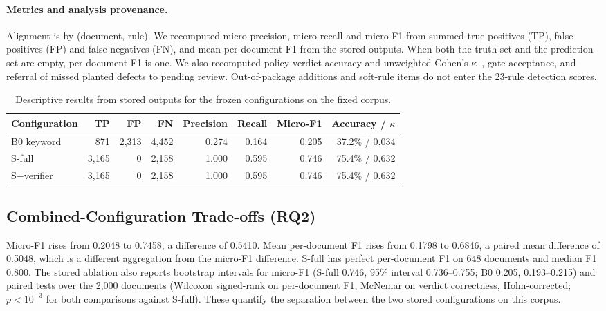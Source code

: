 \documentclass[computers,article,submit,moreauthors]{Definitions/mdpi}
\begin{document}
\paragraph{Metrics and analysis provenance.}
Alignment is by (document, rule). We recomputed micro-precision, micro-recall and micro-F1 from summed true positives (TP), false positives (FP) and false negatives (FN), and mean per-document F1 from the stored outputs. When both the truth set and the prediction set are empty, per-document F1 is one. We also recomputed policy-verdict accuracy and unweighted Cohen's $\kappa$~\cite{cohen1960,landis1977}, gate acceptance, and referral of missed planted defects to pending review. Out-of-package additions and soft-rule items do not enter the 23-rule detection scores.

\begin{table}[!ht]
\caption{Descriptive results from stored outputs for the frozen configurations on the fixed corpus.}
\label{tab:results}
\centering\footnotesize
\begin{tabular}{@{}lrrrrrrr@{}}
\toprule
Configuration & TP & FP & FN & Precision & Recall & Micro-F1 & Accuracy / $\kappa$ \\
\midrule
B0 keyword & 871 & 2,313 & 4,452 & 0.274 & 0.164 & 0.205 & 37.2\% / 0.034 \\
S-full & 3,165 & 0 & 2,158 & 1.000 & 0.595 & 0.746 & 75.4\% / 0.632 \\
S$-$verifier & 3,165 & 0 & 2,158 & 1.000 & 0.595 & 0.746 & 75.4\% / 0.632 \\
\bottomrule
\end{tabular}
\end{table}

\subsection{Combined-Configuration Trade-offs (RQ2)}

Micro-F1 rises from 0.2048 to 0.7458, a difference of 0.5410. Mean per-document F1 rises from 0.1798 to 0.6846, a paired mean difference of 0.5048, which is a different aggregation from the micro-F1 difference. S-full has perfect per-document F1 on 648 documents and median F1 0.800. The stored ablation also reports bootstrap intervals for micro-F1 (S-full 0.746, 95\% interval 0.736--0.755; B0 0.205, 0.193--0.215) and paired tests over the 2,000 documents (Wilcoxon signed-rank on per-document F1, McNemar on verdict correctness, Holm-corrected; $p<10^{-3}$ for both comparisons against S-full). These quantify the separation between the two stored configurations on this corpus.
\end{document}
